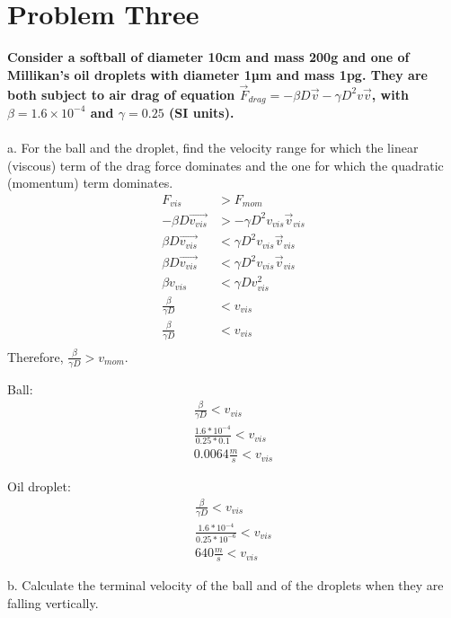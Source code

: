 \documentclass[10pt]{article} %
\begin{document}
\vspace{1 cm}       

\section{Problem Three}
\textbf{Consider a softball of diameter 10cm and mass 200g and one of Millikan’s oil droplets 
with  diameter  1µm  and  mass  1pg.  They  are  both subject  to  air  drag  of  equation
$\vec{F}_{drag} = −\beta D\vec{v} −\gamma D^2v\vec{v}$, with $\beta = 1.6 \times 10^{−4}$ and $\gamma = 0.25$ (SI units).} \\ \\

a. For  the  ball  and  the  droplet,  find  the  velocity  range  for  which  the  linear  (viscous) 
term of the drag force dominates and the one for which the quadratic (momentum) 
term dominates.\\

\begin{align}
  F_{vis} &> F_{mom}\\
  -\beta D\vec{v_{vis}} &> -\gamma D^2v_{vis}\vec{v}_{vis}\\
  \beta D\vec{v_{vis}} &< \gamma D^2v_{vis}\vec{v}_{vis}\\
  \beta D\vec{v_{vis}} &< \gamma D^2v_{vis}\vec{v}_{vis}\\
  \beta v_{vis} &< \gamma Dv^2_{vis}\\
  \frac{\beta}{\gamma D} &< v_{vis}\\
  \frac{\beta}{\gamma D} &< v_{vis}\\
\end{align}
Therefore, $\frac{\beta}{\gamma D}  > v_{mom}$.

Ball:
\begin{align}
  \frac{\beta}{\gamma D} < v_{vis}\\
  \frac{1.6*10^{-4}}{0.25*0.1} < v_{vis}\\
  0.0064 \frac{m}{s} < v_{vis}
\end{align}

Oil droplet:
\begin{align}
  \frac{\beta}{\gamma D} < v_{vis}\\
  \frac{1.6*10^{-4}}{0.25*10^{-6}} < v_{vis}\\
  640 \frac{m}{s} < v_{vis}
\end{align}

b. Calculate the terminal velocity of the ball and of the droplets when they are falling vertically.\\
\end{document}
